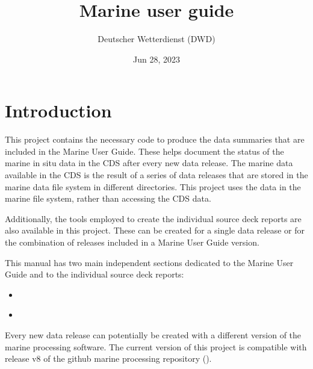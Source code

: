 \documentclass[letterpaper,10pt,english]{sphinxmanual}
\title{Marine user guide}
\date{Jun 28, 2023}
\author{Deutscher Wetterdienst (DWD)}
\begin{document}
\pagestyle{empty}
\sphinxmaketitle
\pagestyle{plain}
\sphinxtableofcontents
\pagestyle{normal}
\label{\detokenize{index::doc}}



%
%
%


\chapter{Introduction}
\label{\detokenize{index:introduction}}
This project contains the necessary code to produce the data summaries that are
included in the Marine User Guide. These helps document the status of the marine
in situ data in the CDS after every new data release. The marine data available
in the CDS is the result of a series of data releases that are stored in the
marine data file system in different directories. This project uses the data in
the marine file system, rather than accessing the CDS data.

Additionally, the tools employed to create the individual source deck reports
are also available in this project. These can be created for a single data
release or for the combination of releases included in a Marine User Guide
version.

This manual has two main independent sections dedicated to the Marine User Guide
and to the individual source deck reports:
\begin{itemize}
\item {} 
{\hyperref[\detokenize{index:marine-user-guide}]{}}

\item {} 
{\hyperref[\detokenize{index:source-deck-reports}]{}}

\end{itemize}

Every new data release can potentially be created with a different version of
the marine processing software. The current version of this project is
compatible with release v8 of the github marine processing repository  ().
\end{document}
